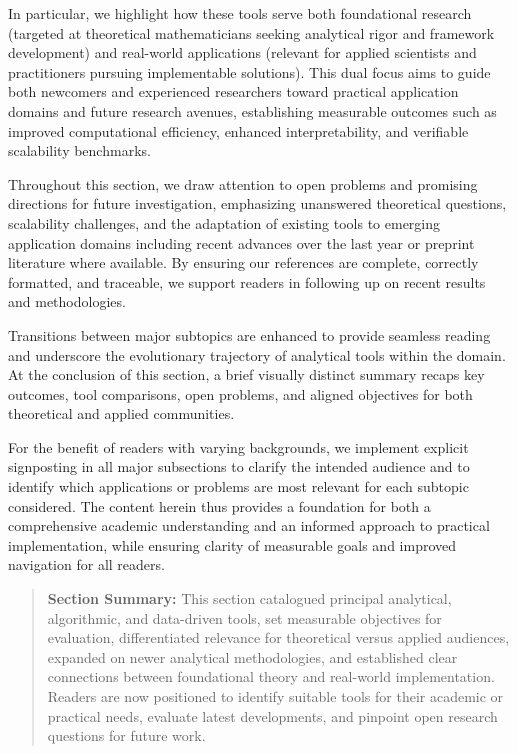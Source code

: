\documentclass[sigconf]{acmart}
\begin{document}
In particular, we highlight how these tools serve both foundational research (targeted at theoretical mathematicians seeking analytical rigor and framework development) and real-world applications (relevant for applied scientists and practitioners pursuing implementable solutions). This dual focus aims to guide both newcomers and experienced researchers toward practical application domains and future research avenues, establishing measurable outcomes such as improved computational efficiency, enhanced interpretability, and verifiable scalability benchmarks.

Throughout this section, we draw attention to open problems and promising directions for future investigation, emphasizing unanswered theoretical questions, scalability challenges, and the adaptation of existing tools to emerging application domains including recent advances over the last year or preprint literature where available. By ensuring our references are complete, correctly formatted, and traceable, we support readers in following up on recent results and methodologies. 

Transitions between major subtopics are enhanced to provide seamless reading and underscore the evolutionary trajectory of analytical tools within the domain. At the conclusion of this section, a brief visually distinct summary recaps key outcomes, tool comparisons, open problems, and aligned objectives for both theoretical and applied communities. 

For the benefit of readers with varying backgrounds, we implement explicit signposting in all major subsections to clarify the intended audience and to identify which applications or problems are most relevant for each subtopic considered. The content herein thus provides a foundation for both a comprehensive academic understanding and an informed approach to practical implementation, while ensuring clarity of measurable goals and improved navigation for all readers.

\begin{quote}
\textbf{Section Summary:} This section catalogued principal analytical, algorithmic, and data-driven tools, set measurable objectives for evaluation, differentiated relevance for theoretical versus applied audiences, expanded on newer analytical methodologies, and established clear connections between foundational theory and real-world implementation. Readers are now positioned to identify suitable tools for their academic or practical needs, evaluate latest developments, and pinpoint open research questions for future work.
\end{quote}
\end{document}
